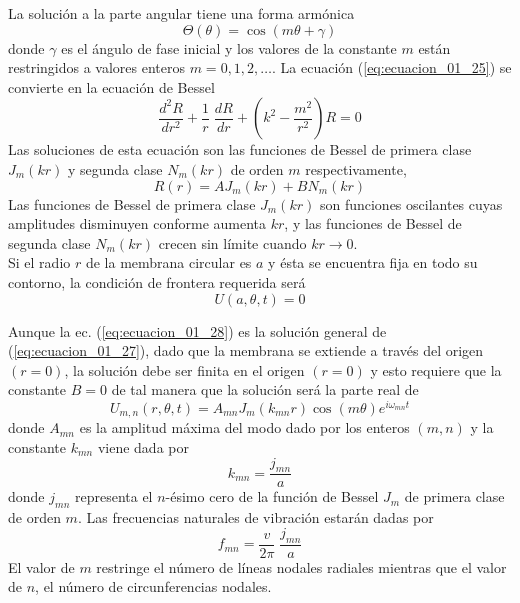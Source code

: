 La solución a la parte angular tiene una forma armónica
\begin{equation}
\Theta (\theta) = \cos (m \theta + \gamma)
\label{eq:ecuacion_01_26}
\end{equation}
donde $\gamma$ es el ángulo de fase inicial y los valores de la constante $m$ están restringidos a valores enteros $m = 0, 1,2, \ldots $. La ecuación (\ref{eq:ecuacion_01_25}) se convierte en la ecuación de Bessel
\begin{equation}
\dfrac{d^{2} R}{d r^{2}} + \dfrac{1}{r} \; \dfrac{d R}{d r}  + \left( k^{2} - \dfrac{m^{2}}{r^{2}} \right) R = 0
\label{eq:ecuacion_01_27}
\end{equation}
Las soluciones de esta ecuación son las funciones de Bessel de primera clase $J_{m}(kr)$ y segunda clase $N_{m}(kr)$ de orden $m$ respectivamente,
\begin{equation}
R(r) = A J_{m} (kr) + B N_{m} (kr)
\label{eq:ecuacion_01_28}
\end{equation}
Las funciones de Bessel de primera clase $J_{m}(kr)$ son funciones oscilantes cuyas amplitudes disminuyen conforme aumenta $kr$, y las funciones de Bessel de segunda clase $N_{m}(kr)$ crecen sin límite cuando $kr \to 0$.
\\
Si el radio $r$ de la membrana circular es $a$ y ésta se encuentra fija en todo su contorno, la condición de frontera requerida será
\begin{equation}
U(a, \theta, t) = 0
\label{eq:ecuacion_01_29}
\end{equation}

Aunque  la ec. (\ref{eq:ecuacion_01_28}) es la solución general de (\ref{eq:ecuacion_01_27}), dado que la membrana se extiende a través del origen $(r = 0)$, la solución debe ser finita en el origen $(r = 0)$ y esto requiere que la constante $B = 0$ de tal manera que la solución será la parte real de
\begin{equation}
U_{m,n} (r, \theta, t) =  A_{mn} J_{m} (k_{mn} r) \cos (m \theta) e^{i \omega_{mn}t}
\label{eq:ecuacion_01_30}
\end{equation}
donde $A_{mn}$ es la amplitud máxima del modo dado por los enteros $(m,n)$ y la constante $k_{mn}$ viene dada por
\begin{equation}
k_{mn} = \dfrac{j_{mn}}{a}
\label{eq:ecuacion_01_31}
\end{equation}
donde $j_{mn}$ representa el $n$-ésimo cero de la función de Bessel $J_{m}$ de primera clase de orden $m$. Las frecuencias naturales de vibración estarán dadas por
\begin{equation}
f_{mn} = \dfrac{v}{2 \pi} \; \dfrac{j_{mn}}{a}
\label{eq:ecuacion_01_32}
\end{equation}
El valor de $m$ restringe el número de líneas nodales radiales mientras que el valor de $n$, el número de circunferencias nodales.


